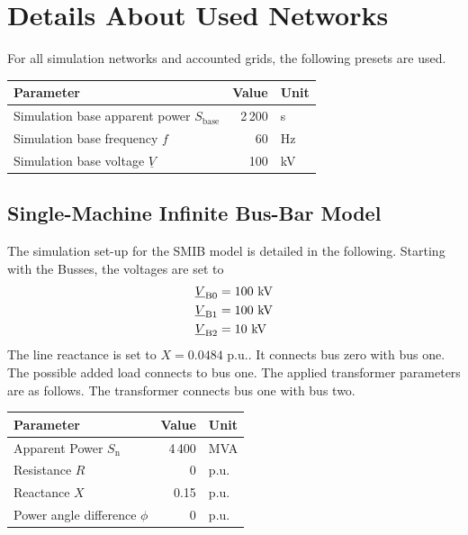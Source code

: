 \section{Details About Used Networks}
\label{app:networks}

For all simulation networks and accounted grids, the following presets are used.

\begin{tabularx}{\textwidth}{Xrl}
    \textbf{Parameter} & \textbf{Value} & \textbf{Unit} \\ \hline
    \toprule
    Simulation base apparent power $S_\mathrm{base}$ & 2\,200 & s \\
    Simulation base frequency $f$ & 60 & Hz \\
    Simulation base voltage $\underline{V}$ & 100 & kV \\
    \bottomrule
\end{tabularx}

\vspace*{1cm}

\subsection{Single-Machine Infinite Bus-Bar Model}
\label{app:smib-model}

The simulation set-up for the \acs{SMIB} model is detailed in the following.
Starting with the Busses, the voltages are set to
\begin{align}
    \underline{V}_\mathrm{B0} &= 100\text{ kV} \notag \\
    \underline{V}_\mathrm{B1} &= 100\text{ kV} \notag \\
    \underline{V}_\mathrm{B2} &= 10\text{ kV} \notag
\end{align}
The line reactance is set to $X=0.0484\text{ p.u.}$.
It connects bus zero with bus one.
The possible added load connects to bus one.
The applied transformer parameters are as follows.
The transformer connects bus one with bus two.

\begin{tabularx}{\textwidth}{Xrl}
    \textbf{Parameter} & \textbf{Value} & \textbf{Unit} \\ \hline
    \toprule
    Apparent Power $S_\mathrm{n}$ & 4\,400 & MVA \\
    Resistance $R$ & 0 & p.u. \\
    Reactance $X$ & 0.15 & p.u. \\
    Power angle difference $\phi$ & 0 & p.u. \\
    \bottomrule
\end{tabularx}

